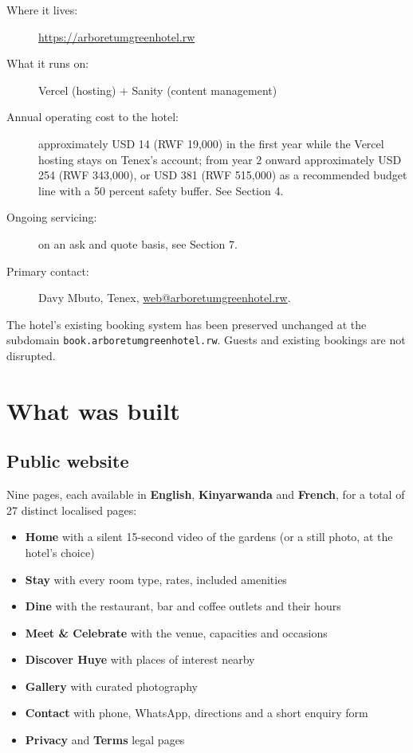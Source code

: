 \documentclass[11pt,a4paper]{article}
\begin{document}
\begin{description}
\item[Where it lives:] \url{https://arboretumgreenhotel.rw}
\item[What it runs on:] Vercel (hosting) + Sanity (content management)
\item[Annual operating cost to the hotel:] approximately USD 14 (RWF 19{,}000) in the first year while the Vercel hosting stays on Tenex's account; from year 2 onward approximately USD 254 (RWF 343{,}000), or USD 381 (RWF 515{,}000) as a recommended budget line with a 50 percent safety buffer. See Section 4.
\item[Ongoing servicing:] on an ask and quote basis, see Section 7.
\item[Primary contact:] Davy Mbuto, Tenex, \href{mailto:web@arboretumgreenhotel.rw}{web@arboretumgreenhotel.rw}.
\end{description}

The hotel's existing booking system has been preserved unchanged at the subdomain \texttt{book.\allowbreak arboretumgreenhotel.\allowbreak rw}. Guests and existing bookings are not disrupted.

\section{What was built}

\subsection{Public website}

Nine pages, each available in \textbf{English}, \textbf{Kinyarwanda} and \textbf{French}, for a total of 27 distinct localised pages:

\begin{itemize}
\item \textbf{Home} with a silent 15-second video of the gardens (or a still photo, at the hotel's choice)
\item \textbf{Stay} with every room type, rates, included amenities
\item \textbf{Dine} with the restaurant, bar and coffee outlets and their hours
\item \textbf{Meet \& Celebrate} with the venue, capacities and occasions
\item \textbf{Discover Huye} with places of interest nearby
\item \textbf{Gallery} with curated photography
\item \textbf{Contact} with phone, WhatsApp, directions and a short enquiry form
\item \textbf{Privacy} and \textbf{Terms} legal pages
\end{itemize}
\end{document}
